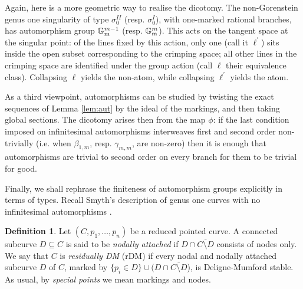 \documentclass[11pt]{amsart}
\newcommand{\Gm}{\mathbb{G}_{\rm{m}}}
\theoremstyle{plain}
\theoremstyle{definition}
\newtheorem{dfn}[thm]{Definition}
\begin{document}
Again, here is a more geometric way to realise the dicotomy. The non-Gorenstein genus one singularity of type $\sigma_0^{I\!I}$ (resp. $\sigma_0^{I}$), with one-marked rational branches, has automorphism group $\Gm^{m-1}$ (resp. $\Gm^m$). This acts on the tangent space at the singular point: of the lines fixed by this action, only one (call it $\ell^\prime$) sits inside the open subset corresponding to the crimping space; all other lines in the crimping space are identified under the group action (call $\ell$ their equivalence class). Collapsing $\ell$ yields the non-atom, while collapsing $\ell^\prime$ yields the atom.

As a third viewpoint, automorphisms can be studied by twisting the exact sequences of Lemma \ref{lem:aut} by the ideal of the markings, and then taking global sections. The dicotomy arises then from the map $\phi$: if the last condition imposed on infinitesimal automorphisms interweaves first and second order non-trivially (i.e. when $\beta_{1,m}$, resp. $\gamma_{m,m}$, are non-zero) then it is enough that automorphisms are trivial to second order on every branch for them to be trivial for good.

\smallskip

Finally, we shall rephrase the finiteness of automorphism groups explicitly in terms of types. Recall Smyth's description of genus one curves with no infinitesimal automorphisms \cite[Proposition 2.3, Corollary 2.4]{SMY1}.

\begin{dfn}
 Let $(C,p_1,\ldots,p_n)$ be a reduced pointed curve. A connected subcurve $D\subseteq C$ is said to be \emph{nodally attached} if $D\cap\overline{C\setminus D}$ consists of nodes only.
  We say that $C$ is \emph{residually DM} (rDM) if every nodal and nodally attached subcurve $D$ of $C$, marked by $\{p_i\in D\}\cup (D\cap\overline{C\setminus D}$), is Deligne-Mumford stable. As usual, by \emph{special points} we mean markings and nodes.
\end{dfn}
\end{document}
